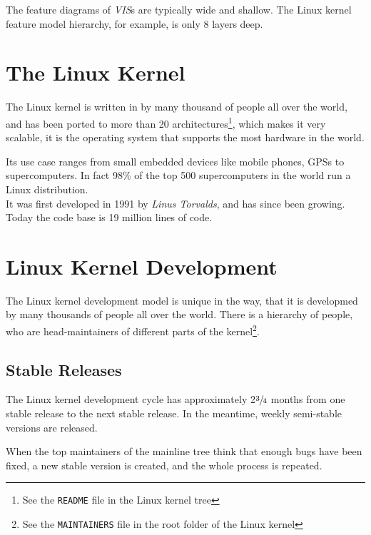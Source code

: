 \documentclass[a4paper,11pt]{report}
\newcommand{\f}{\footnote{\fn}}
\newcommand{\textcode}[1]{\fboxsep=1pt\texttt{\colorbox{gray!20}{#1}}}
\begin{document}
The feature diagrams of \emph{VIS}s are typically wide and shallow. The Linux 
kernel feature model hierarchy, for example, is only 8 layers deep\cite[p. 
17]{VarModSSD}.


            
        \section{The Linux Kernel}

            \def \fn {See the \textcode{README} file in the Linux kernel tree}

The Linux kernel is written in by many thousand of people all over 
the world, and has been ported to more than 20 architectures\f, which makes it 
very scalable, it is the operating system that supports the most hardware in
the world\cite{22thbirthday,gkh}.

Its use case ranges from small embedded devices like mobile phones, GPSs to 
supercomputers. In fact 98\% of the top 500 supercomputers in the world run a 
Linux distribution\cite{top500}. 
\\

It was first developed in 1991 by \emph{Linus Torvalds}, and has since been 
growing. Today the code base is 19 million lines of code.


            \section{Linux Kernel Development}

            \def \fn {See the \textcode{MAINTAINERS} file in the root folder of the Linux kernel}

The Linux kernel development model is unique in the  way, that it is developmed 
by many thousands of people all over the world. There is a hierarchy of people, 
who are head-maintainers of different parts of the kernel\f.


            \subsection*{Stable Releases}

The Linux kernel development cycle has approximately 2$\sfrac{3}{4}$ months 
from one stable release to the next stable release\cite
    {crystalball}.
In the meantime, weekly semi-stable versions are released.

When the top maintainers of the mainline tree think that enough bugs have been 
fixed, a new stable version is created, and the whole process is repeated.
\end{document}
